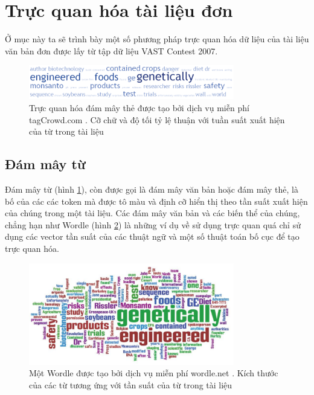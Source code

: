 \documentclass[14pt, a4paper]{article}
\numberwithin{equation}{section}
\numberwithin{figure}{section}
\numberwithin{dl}{section}
\numberwithin{md}{section}
\numberwithin{bd}{section}
\numberwithin{dn}{section}
\numberwithin{hq}{section}
\begin{document}
    \section{Trực quan hóa tài liệu đơn}

    Ở mục này ta sẽ trình bày một số phương pháp trực quan hóa dữ liệu của tài liệu văn bản đơn được lấy từ tập dữ liệu VAST Contest 2007.

    \begin{figure}[h!]
        \centering
        \includegraphics[width=0.8\textwidth]{4.png}
        \caption{Trực quan hóa đám mây thẻ được tạo bởi dịch vụ miễn phí tagCrowd.com \cite{396}.
        Cỡ chữ và độ tối tỷ lệ thuận với tuần suất xuất hiện của từ trong tài liệu}
        \label{fig:4}
    \end{figure}

    \subsection{Đám mây từ}

    Đám mây từ (hình \ref{fig:4}), còn được gọi là đám mây văn bản hoặc đám mây thẻ, là bố của các các token mà được tô màu và định cỡ hiển thị theo tần suất xuất hiện của chúng trong một tài liệu.
    Các đám mây văn bản và các biến thể của chúng, chẳng hạn như Wordle (hình \ref{fig:5}) là những ví dụ về sử dụng trực quan quá chỉ sử dụng các vector tần suất của các thuật ngữ và một số thuật toán bố cục để tạo trực quan hóa.


    \begin{figure}[h!]
        \centering
        \includegraphics[width=0.8\textwidth]{5.png}
        \caption{Một Wordle được tạo bởi dịch vụ miễn phí wordle.net \cite{118}.
        Kích thước của các từ tương ứng với tần suất của từ trong tài liệu}
        \label{fig:5}
    \end{figure}
\end{document}
